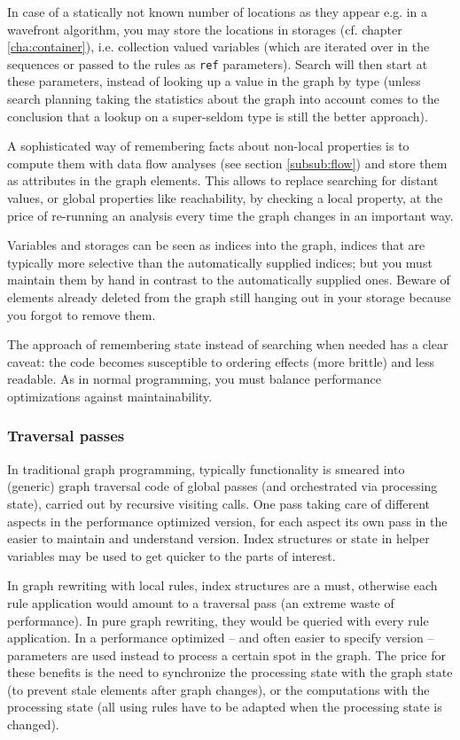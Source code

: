 In case of a statically not known number of locations as they appear e.g. in a wavefront algorithm, you may store the locations in storages (cf. chapter \ref{cha:container}), i.e. collection valued variables (which are iterated over in the sequences or passed to the rules as \texttt{ref} parameters).
Search will then start at these parameters, instead of looking up a value in the graph by type (unless search planning taking the statistics about the graph into account comes to the conclusion that a lookup on a super-seldom type is still the better approach).

A sophisticated way of remembering facts about non-local properties is to compute them with data flow analyses (see section \ref{subsub:flow}) and store them as attributes in the graph elements.
This allows to replace searching for distant values, or global properties like reachability, by checking a local property, at the price of re-running an analysis every time the graph changes in an important way.

Variables and storages can be seen as indices into the graph, indices that are typically more selective than the automatically supplied indices; 
but you must maintain them by hand in contrast to the automatically supplied ones.
Beware of elements already deleted from the graph still hanging out in your storage because you forgot to remove them.

The approach of remembering state instead of searching when needed has a clear caveat: the code becomes susceptible to ordering effects (more brittle) and less readable. 
As in normal programming, you must balance performance optimizations against maintainability.

\subsubsection*{Traversal passes}

In traditional graph programming, 
typically functionality is smeared into (generic) graph traversal code of global passes (and orchestrated via processing state), carried out by recursive visiting calls.
One pass taking care of different aspects in the performance optimized version,
for each aspect its own pass in the easier to maintain and understand version.
Index structures or state in helper variables may be used to get quicker to the parts of interest.

In graph rewriting with local rules, index structures are a must, otherwise each rule application would amount to a traversal pass (an extreme waste of performance).
In pure graph rewriting, they would be queried with every rule application.
In a performance optimized -- and often easier to specify version -- parameters are used instead to process a certain spot in the graph.
The price for these benefits is the need to synchronize the processing state with the graph state (to prevent stale elements after graph changes), or the computations with the processing state (all using rules have to be adapted when the processing state is changed).

